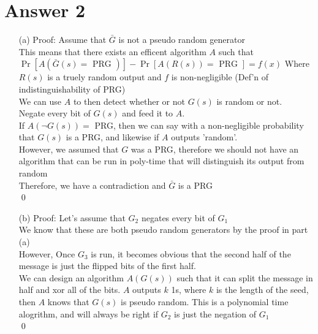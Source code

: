 \documentclass[11pt]{article}
\theoremstyle{definition}
\begin{document}
\section*{Answer 2}
\begin{enumerate}
	\item[(a)]
	Proof: Assume that $\bar{G}$ is not a pseudo random generator\\
	This means that there exists an efficent algorithm $A$ such that $\Pr[A(\bar{G}(s) = \text{ PRG })] - \Pr[A(R(s)) = \text{ PRG }] = f(x)$ Where $R(s)$ is a truely random output and $f$ is non-negligible  (Def'n of indistinguishability of PRG)\\
	We can use $A$ to then detect whether or not $G(s)$ is random or not.\\
	Negate every bit of $G(s)$ and feed it to $A$.\\
	If $A(\neg G(s)) =$ PRG, then we can say with a non-negligible probability that $G(s)$ is a PRG, and likewise if $A$ outputs 'random'.\\
	However, we assumed that $G$ was a PRG, therefore we should not have an algorithm that can be run in poly-time that will distinguish its output from random\\
	Therefore, we have a contradiction and $\bar{G}$ is a PRG\\
	\qed

	\item[(b)]
	Proof: Let's assume that $G_2$ negates every bit of $G_1$\\ We know that these are both pseudo random generators by the proof in part (a)\\
	However, Once $G_3$ is run, it becomes obvious that the second half of the message is just the flipped bits of the first half.\\
	We can design an algorithm $A(G(s))$ such that it can split the message in half and xor all of the bits.  $A$ outputs $k$ 1s, where $k$ is the length of the seed, then $A$ knows that $G(s)$ is pseudo random.  This is a polynomial time alogrithm, and will always be right if $G_2$ is just the negation of $G_1$\\
	\qed
\end{enumerate}
\end{document}

